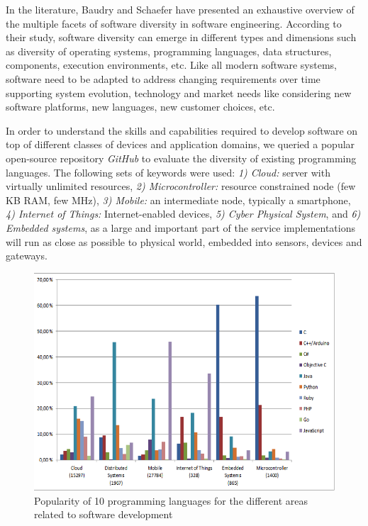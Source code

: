 In the literature, Baudry \etal\cite{baudry2015multiple} and Schaefer \etal\cite{schaefer2012software} have presented an exhaustive overview of the multiple facets of software diversity in software engineering. 
According to their study, software diversity can emerge in different types and dimensions such as diversity of operating systems, programming languages, data structures, components, execution environments, etc. 
Like all modern software systems, software need to be adapted to address changing requirements over time supporting system evolution, technology and market needs like considering new software platforms, new languages, new customer choices, etc.

In order to understand the skills and capabilities required to develop software on top of different classes of devices and application domains, we queried a popular open-source repository \textit{GitHub} to evaluate the diversity of existing programming languages.  
The following sets of keywords were used: \textit{1) Cloud:} server with virtually unlimited resources, \textit{2) Microcontroller:} resource constrained node (few KB RAM, few MHz),  \textit{3) Mobile:} an intermediate node, typically a smartphone,  \textit{4) Internet of Things:} Internet-enabled devices,  \textit{5) Cyber Physical System}, and  \textit{6) Embedded systems}, as a large and important part of the service implementations will run as close as possible to physical world, embedded into sensors, devices and gateways.

\begin{figure}[h]
	\center
	\includegraphics[scale=1.]{Background/fig/github}
	\caption{Popularity of 10 programming languages for the different areas related to software development}
	\label{fig:github}
\end{figure}

